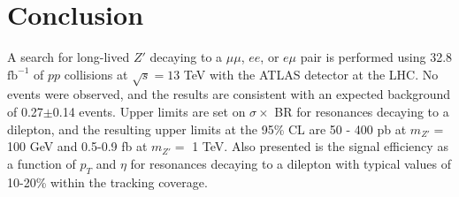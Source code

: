 \chapter{Conclusion}
\label{chap:conclusion}

A search for long-lived $Z'$ decaying to a $\mu\mu$, $ee$, or $e\mu$ pair is performed using 32.8 $\mathrm{fb^{-1}}$ of $pp$ collisions at $\sqrt{s}=13$ TeV with the ATLAS detector at the LHC. No events were observed, and the results are consistent with an expected background of 0.27$\pm$0.14 events. Upper limits are set on $\sigma \times$ BR for resonances decaying to a dilepton, and the resulting upper limits at the 95\% CL are 50 - 400 pb at $m_{Z'}=$ 100 GeV and 0.5-0.9 fb at $m_{Z'}=$ 1 TeV. %
Also presented is the signal efficiency as a function of $p_{T}$ and $\eta$ for resonances decaying to a dilepton with typical values of 10-20\% within the tracking coverage.


